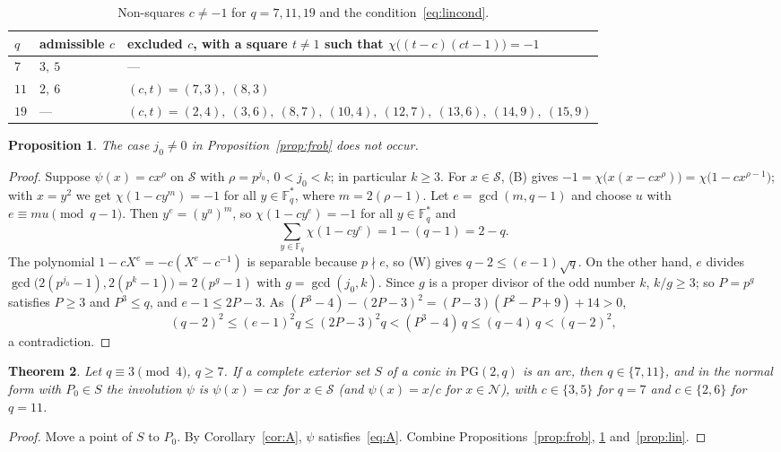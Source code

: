 \documentclass[11pt]{amsart}
\newtheorem{theorem}{Theorem}[section]
\newtheorem{proposition}[theorem]{Proposition}
\theoremstyle{definition}
\theoremstyle{remark}
\numberwithin{equation}{section}
\newcommand{\F}{\mathbb{F}_q}
\newcommand{\Fs}{\mathbb{F}_q^{*}}
\newcommand{\PGtwo}{\mathrm{PG}(2,q)}
\newcommand{\Sq}{\mathcal{S}}
\newcommand{\Ns}{\mathcal{N}}
\begin{document}
\begin{table}[ht]
\centering
\caption{Non-squares $c\neq-1$ for $q=7,11,19$ and the condition~\eqref{eq:lincond}.}\label{tab:witness}
\begin{tabular}{@{}lll@{}}
\toprule
$q$ & admissible $c$ & excluded $c$, with a square $t\ne1$ such that $\chi\bigl((t-c)(ct-1)\bigr)=-1$\\
\midrule
$7$  & $3,\ 5$ & ---\\
$11$ & $2,\ 6$ & $(c,t)=(7,3),\ (8,3)$\\
$19$ & --- & $(c,t)=(2,4),\ (3,6),\ (8,7),\ (10,4),\ (12,7),\ (13,6),\ (14,9),\ (15,9)$\\
\bottomrule
\end{tabular}
\end{table}

\begin{proposition}\label{prop:frob-impossible}
The case $j_0\ne0$ in Proposition~\ref{prop:frob} does not occur.
\end{proposition}

\begin{proof}
Suppose $\psi(x)=cx^\rho$ on $\Sq$ with $\rho=p^{j_0}$, $0<j_0<k$; in particular $k\ge3$. For $x\in\Sq$, (B) gives
$-1=\chi\bigl(x(x-cx^\rho)\bigr)=\chi\bigl(1-cx^{\rho-1}\bigr)$; with $x=y^2$ we get $\chi(1-cy^m)=-1$ for all $y\in\Fs$, where
$m=2(\rho-1)$. Let $e=\gcd(m,q-1)$ and choose $u$ with $e\equiv mu\pmod{q-1}$. Then $y^e=(y^u)^m$, so $\chi(1-cy^e)=-1$ for all
$y\in\Fs$ and
\[
\sum_{y\in\F}\chi(1-cy^e)=1-(q-1)=2-q .
\]
The polynomial $1-cX^e=-c(X^e-c^{-1})$ is separable because $p\nmid e$, so (W) gives $q-2\le(e-1)\sqrt q$. On the other hand,
$e$ divides $\gcd\bigl(2(p^{j_0}-1),2(p^k-1)\bigr)=2(p^g-1)$ with $g=\gcd(j_0,k)$. Since $g$ is a proper divisor of the odd number $k$,
$k/g\ge3$; so $P=p^g$ satisfies $P\ge3$ and $P^3\le q$, and $e-1\le2P-3$. As $(P^3-4)-(2P-3)^2=(P-3)(P^2-P+9)+14>0$,
\[
(q-2)^2\le(e-1)^2q\le(2P-3)^2q<(P^3-4)\,q\le(q-4)\,q<(q-2)^2,
\]
a contradiction.
\end{proof}

\begin{theorem}\label{thm:q3}
Let $q\equiv3\pmod 4$, $q\ge7$. If a complete exterior set $S$ of a conic in $\PGtwo$ is an arc, then $q\in\{7,11\}$, and in the
normal form with $P_0\in S$ the involution $\psi$ is $\psi(x)=cx$ for $x\in\Sq$ (and $\psi(x)=x/c$ for $x\in\Ns$), with $c\in\{3,5\}$
for $q=7$ and $c\in\{2,6\}$ for $q=11$.
\end{theorem}

\begin{proof}
Move a point of $S$ to $P_0$. By Corollary~\ref{cor:A}, $\psi$ satisfies~\eqref{eq:A}. Combine
Propositions~\ref{prop:frob}, \ref{prop:frob-impossible} and~\ref{prop:lin}.
\end{proof}
\end{document}
